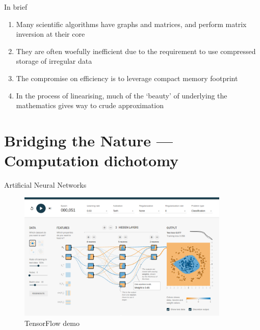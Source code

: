 \documentclass[xcolor=dvipsnames]{beamer}
\begin{document}
\begin{frame}{In brief}
  \begin{enumerate}
  \item Many scientific algorithms have graphs and matrices, and perform matrix inversion at their core\vspace{5mm}
  \item They are often woefully inefficient due to the requirement to use compressed storage of irregular data\vspace{5mm}
  \item The compromise on efficiency is to leverage compact memory footprint\vspace{5mm}
  \item In the process of linearising, much of the `beauty' of underlying the mathematics gives way to crude approximation\vspace{5mm}
  \end{enumerate}
\end{frame}


\section{Bridging the Nature --- Computation dichotomy}


\begin{frame}{Artificial Neural Networks}
\begin{figure}
  \centering
  \caption {TensorFlow demo}
  \includegraphics[width=0.9\textwidth]{tensorflow_demo}
\end{figure}
\end{frame}
\end{document}
